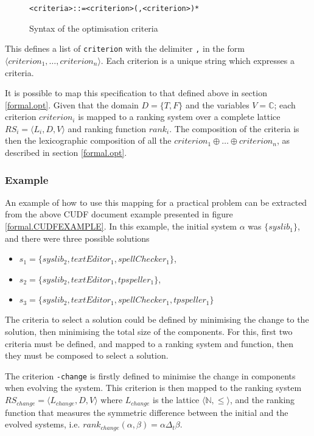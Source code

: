 \begin{figure}[h!]
\begin{center}
\begin{alltt}
<criteria> ::= <criterion> (, <criterion>)*
\end{alltt}
  \caption{Syntax of the optimisation criteria}
  \label{formal.optbnf}
\end{center}
\end{figure}

This defines a list of \verb+criterion+ with the delimiter \verb+,+ in the form $\langle criterion_1, \ldots, criterion_n \rangle$.
Each criterion is a unique string which expresses a criteria.

It is possible to map this specification to that defined above in section \ref{formal.opt}.
Given that the domain $D = \{T,F\}$ and the variables $V = \mathbb{C}$;
each criterion $criterion_i$ is mapped to a ranking system over a complete lattice $RS_i = \langle L_i,D,V \rangle$
and ranking function $rank_i$.
The composition of the criteria is then the lexicographic composition of all the $criterion_1 \oplus \ldots \oplus criterion_n$, as described in section \ref{formal.opt}.

\subsubsection{Example}
An example of how to use this mapping for a practical problem can be extracted from the above CUDF document example presented in figure \ref{formal.CUDFEXAMPLE}.
In this example, the initial system $\alpha$ was  $\{syslib_1\}$, and there were three possible solutions
\begin{itemize}
  \item $s_1 = \{syslib_2, textEditor_1, spellChecker_1\}$,
  \item $s_2 = \{syslib_2, textEditor_1, tpspeller_1\}$,
  \item $s_3 = \{syslib_2, textEditor_1, spellChecker_1, tpspeller_1\}$
\end{itemize}

The criteria to select a solution could be defined by minimising the change to the solution, then minimising the total size of the components.
For this, first two criteria must be defined, and mapped to a ranking system and function, then they must be composed to select a solution.

The criterion \verb+-change+ is firstly defined to minimise the change in components when evolving the system.
This criterion is then mapped to the ranking system $RS_{change} = \langle L_{change},D,V \rangle$ where  $L_{change}$ is the lattice $\langle \mathbb{N}, \leq \rangle$,
and the ranking function that measures the symmetric difference between the initial and the evolved systems, i.e. $rank_{change}(\alpha,\beta) = \alpha \Delta_t \beta$.

